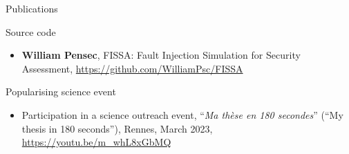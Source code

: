 \begin{frame}[allowframebreaks]{Publications}
    \begin{block}{Source code}
        \begin{itemize}
            \item {\footnotesize \textbf{William Pensec}, FISSA: Fault Injection Simulation for Security Assessment, \url{https://github.com/WilliamPsc/FISSA}}
        \end{itemize}
    \end{block}

    \begin{block}{Popularising science event}
        \begin{itemize}
            \item {\footnotesize Participation in a science outreach event, “\textit{Ma thèse en 180 secondes}” (“My thesis in 180 seconds”), Rennes, March 2023, \url{https://youtu.be/m_whL8xGbMQ}}
        \end{itemize}
    \end{block}
\end{frame}
\begin{frame}{}
    \backpage
\end{frame}
